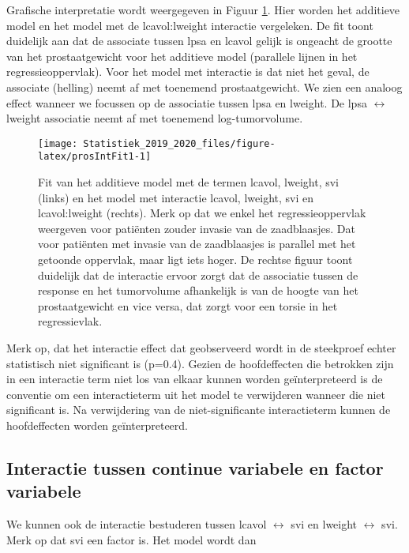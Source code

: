 \documentclass[12pt,dutch,coursenotes]{book}
\theoremstyle{definition}
\theoremstyle{definition}
\theoremstyle{definition}
\theoremstyle{remark}
\begin{document}
Grafische interpretatie wordt weergegeven in Figuur
\ref{fig:prosIntFit1}. Hier worden het additieve model en het model met
de lcavol:lweight interactie vergeleken. De fit toont duidelijk aan dat
de associate tussen lpsa en lcavol gelijk is ongeacht de grootte van het
prostaatgewicht voor het additieve model (parallele lijnen in het
regressieoppervlak). Voor het model met interactie is dat niet het
geval, de associate (helling) neemt af met toenemend prostaatgewicht. We
zien een analoog effect wanneer we focussen op de associatie tussen lpsa
en lweight. De lpsa \(\leftrightarrow\) lweight associatie neemt af met
toenemend log-tumorvolume.

\begin{figure}

{\centering \texttt{[image: Statistiek\_2019\_2020\_files/figure-latex/prosIntFit1-1]} 

}

\caption{Fit van het additieve model met de termen lcavol, lweight, svi (links) en het model met interactie lcavol, lweight, svi en lcavol:lweight (rechts). Merk op dat we enkel het regressieoppervlak weergeven voor patiënten zouder invasie van de zaadblaasjes. Dat voor patiënten met invasie van de zaadblaasjes is parallel met het getoonde oppervlak, maar ligt iets hoger. De rechtse figuur toont duidelijk dat de interactie ervoor zorgt dat de associatie tussen de response en het tumorvolume afhankelijk is van de hoogte van het prostaatgewicht en vice versa, dat zorgt voor een torsie in het regressievlak.}\label{fig:prosIntFit1}
\end{figure}

Merk op, dat het interactie effect dat geobserveerd wordt in de
steekproef echter statistisch niet significant is (p=0.4). Gezien de
hoofdeffecten die betrokken zijn in een interactie term niet los van
elkaar kunnen worden geïnterpreteerd is de conventie om een
interactieterm uit het model te verwijderen wanneer die niet significant
is. Na verwijdering van de niet-significante interactieterm kunnen de
hoofdeffecten worden geïnterpreteerd.

\subsection{Interactie tussen continue variabele en factor
variabele}\label{interactie-tussen-continue-variabele-en-factor-variabele}

We kunnen ook de interactie bestuderen tussen lcavol \(\leftrightarrow\)
svi en lweight \(\leftrightarrow\) svi. Merk op dat svi een factor is.
Het model wordt dan
\end{document}
